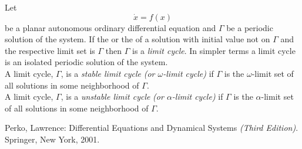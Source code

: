 \documentclass[12pt]{article}
\begin{document}

Let
$$\dot{x}=f(x)$$
be a planar autonomous ordinary differential equation and $\Gamma$ be a periodic solution of the system.  If the  or the  of a solution with initial value not on $\Gamma$ and the respective limit set is $\Gamma$ then $\Gamma$ is a \emph{limit cycle}.    In simpler terms a limit cycle is an isolated periodic solution of the system.\\
A limit cycle, $\Gamma$, is a \emph{stable limit cycle} \textit{(or \emph{$\omega$-limit cycle})} if $\Gamma$ is the $\omega$-limit set of all solutions in some neighborhood of $\Gamma$.\\
A limit cycle, $\Gamma$, is a \emph{unstable limit cycle} \textit{(or \emph{$\alpha$-limit cycle})} if $\Gamma$ is the $\alpha$-limit set of all solutions in some neighborhood of $\Gamma$.\cite{PL}

\begin{thebibliography}{2}
 Perko, Lawrence: Differential Equations and Dynamical Systems \textit{(Third Edition)}. Springer, New York, 2001.
\end{thebibliography}
\end{document}
